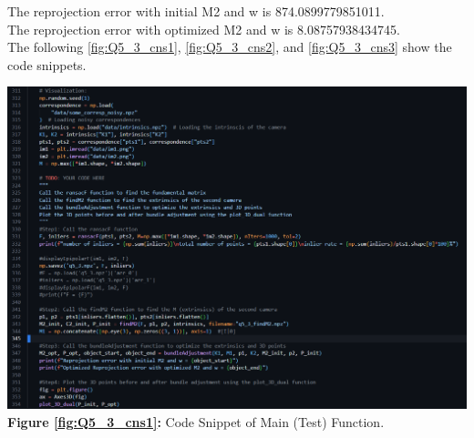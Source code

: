 \begin{your_solution}[title=Q5.3,height=21.5cm,width=\linewidth]
\end{your_solution}

\begin{your_solution}[title=Q5.3 continued,height=16.5cm,width=\linewidth]
	The reprojection error with initial M2 and w is 874.0899779851011. \\
	The reprojection error with optimized M2 and w is 8.08757938434745. \\
	The following \autoref{fig:Q5_3_cns1}, \autoref{fig:Q5_3_cns2}, and \autoref{fig:Q5_3_cns3} show the code snippets.
	\newline
	
	\begin{minipage}{1\linewidth}
		\centering
		\includegraphics[width=1\linewidth, height=0.8\columnwidth]{../Q5_3_cns1.png}
		\textbf{Figure \ref{fig:Q5_3_cns1}:} Code Snippet of Main (Test) Function.
		\label{fig:Q5_3_cns1}         %
	\end{minipage}	
\end{your_solution}
\newpage
